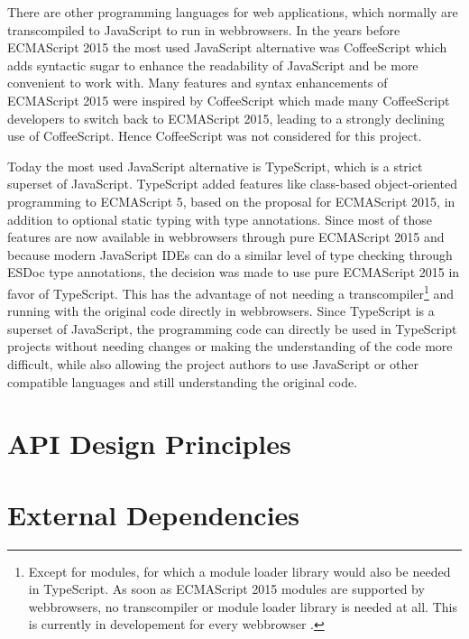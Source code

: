 There are other programming languages for web applications, which normally are
transcompiled to JavaScript to run in webbrowsers. In the years before
\gls{ECMAScript 2015} the most used JavaScript alternative was CoffeeScript
which adds syntactic sugar to enhance the readability of JavaScript and be more
convenient to work with. Many features and syntax enhancements of
\gls{ECMAScript 2015} were inspired by CoffeeScript which made many CoffeeScript
developers to switch back to \gls{ECMAScript 2015}, leading to a strongly
declining use of CoffeeScript. Hence CoffeeScript was not considered for this
project.

Today the most used JavaScript alternative is TypeScript, which is a strict
superset of JavaScript. TypeScript added features like class-based
object-oriented programming to \gls{ECMAScript} 5, based on the proposal for
\gls{ECMAScript 2015}, in addition to optional static typing with type
annotations. Since most of those features are now available in webbrowsers
through pure \gls{ECMAScript 2015} and because modern JavaScript \glspl{IDE} can
do a similar level of type checking through \gls{ESDoc} type annotations, the
decision was made to use pure \gls{ECMAScript 2015} in favor of TypeScript. This
has the advantage of not needing a transcompiler\footnote{Except for modules,
for which a module loader library would also be needed in TypeScript. As soon as
\gls{ECMAScript 2015} modules are supported by webbrowsers, no transcompiler or
module loader library is needed at all. This is currently in developement for
every webbrowser \cite{Microsoft2016modules}.} and running with the original code
directly in webbrowsers. Since TypeScript is a superset of JavaScript, the
programming code can directly be used in TypeScript projects without needing
changes or making the understanding of the code more difficult, while also
allowing the project authors to use JavaScript or other compatible languages
and still understanding the original code.

\section{API Design Principles}
\section{External Dependencies}